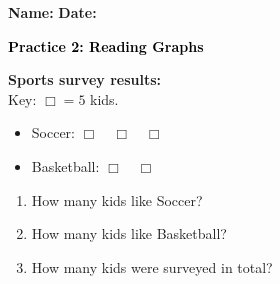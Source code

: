 \documentclass[12pt, letterpaper, fleqn]{article}
\newcommand{\blank}{\underline{\hspace{2.2cm}}}
\begin{document}
\textbf{Name:} \underline{\hspace{5cm}}
\hfill
\textbf{Date:} \underline{\hspace{3cm}}\\

\begin{tcolorbox}[colback=customteal!20]
    \large\textcolor{black}{\textbf{Practice 2: Reading Graphs}}
\end{tcolorbox}

\vspace{5mm}
\noindent
\textbf{Sports survey results:}
\\
Key: $\Box = 5$ kids.
\begin{itemize}
  \item Soccer: $\Box \quad \Box \quad \Box$
  \item Basketball: $\Box \quad \Box$
\end{itemize}

\vspace{5mm}
\begin{enumerate}[itemsep=2.5cm, leftmargin=0.6cm]
\item How many kids like Soccer? \blank
\item How many kids like Basketball? \blank
\item How many kids were surveyed in total? \blank
\end{enumerate}
\end{document}
